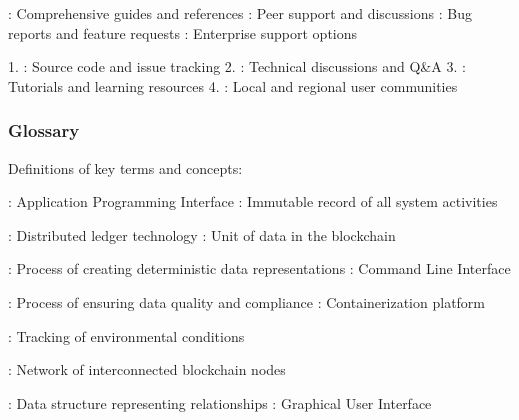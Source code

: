 \documentclass[letterpaper,10pt,english]{sphinxmanual}
\begin{document}
\sphinxAtStartPar
{}
\sphinxhyphen{} : Comprehensive guides and references
\sphinxhyphen{} : Peer support and discussions
\sphinxhyphen{} : Bug reports and feature requests
\sphinxhyphen{} : Enterprise support options

\sphinxAtStartPar
{}
1. : Source code and issue tracking
2. : Technical discussions and Q\&A
3. : Tutorials and learning resources
4. : Local and regional user communities


\subsubsection{Glossary}
\label{\detokenize{user-guide/index:glossary}}
\sphinxAtStartPar
Definitions of key terms and concepts:

\sphinxAtStartPar
{}
\sphinxhyphen{} : Application Programming Interface
\sphinxhyphen{} : Immutable record of all system activities

\sphinxAtStartPar
{}
\sphinxhyphen{} : Distributed ledger technology
\sphinxhyphen{} : Unit of data in the blockchain

\sphinxAtStartPar
{}
\sphinxhyphen{} : Process of creating deterministic data representations
\sphinxhyphen{} : Command Line Interface

\sphinxAtStartPar
{}
\sphinxhyphen{} : Process of ensuring data quality and compliance
\sphinxhyphen{} : Containerization platform

\sphinxAtStartPar
{}
\sphinxhyphen{} : Tracking of environmental conditions

\sphinxAtStartPar
{}
\sphinxhyphen{} : Network of interconnected blockchain nodes

\sphinxAtStartPar
{}
\sphinxhyphen{} : Data structure representing relationships
\sphinxhyphen{} : Graphical User Interface
\end{document}
